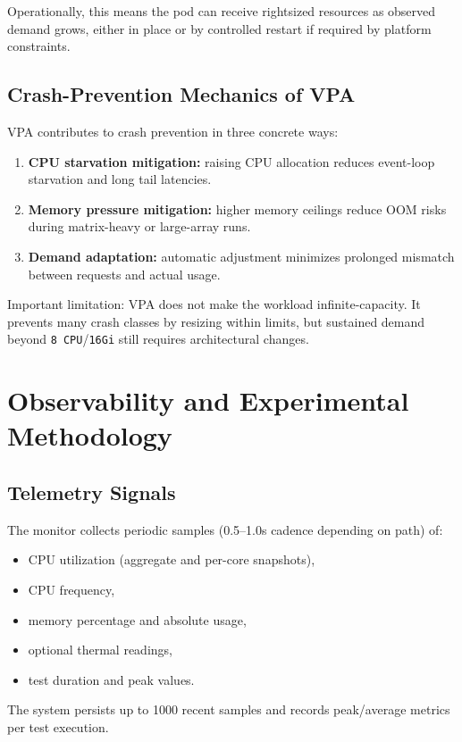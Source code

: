 \documentclass[11pt,a4paper]{article}
\begin{document}
Operationally, this means the pod can receive rightsized resources as observed demand grows, either in place or by controlled restart if required by platform constraints.

\subsection{Crash-Prevention Mechanics of VPA}
VPA contributes to crash prevention in three concrete ways:

\begin{enumerate}[leftmargin=1.5em]
	\item \textbf{CPU starvation mitigation:} raising CPU allocation reduces event-loop starvation and long tail latencies.
	\item \textbf{Memory pressure mitigation:} higher memory ceilings reduce OOM risks during matrix-heavy or large-array runs.
	\item \textbf{Demand adaptation:} automatic adjustment minimizes prolonged mismatch between requests and actual usage.
\end{enumerate}

Important limitation: VPA does not make the workload infinite-capacity. It prevents many crash classes by resizing within limits, but sustained demand beyond \texttt{8 CPU}/\texttt{16Gi} still requires architectural changes.

\section{Observability and Experimental Methodology}

\subsection{Telemetry Signals}
The monitor collects periodic samples (0.5--1.0s cadence depending on path) of:

\begin{itemize}[leftmargin=1.5em]
	\item CPU utilization (aggregate and per-core snapshots),
	\item CPU frequency,
	\item memory percentage and absolute usage,
	\item optional thermal readings,
	\item test duration and peak values.
\end{itemize}

The system persists up to 1000 recent samples and records peak/average metrics per test execution.
\end{document}
